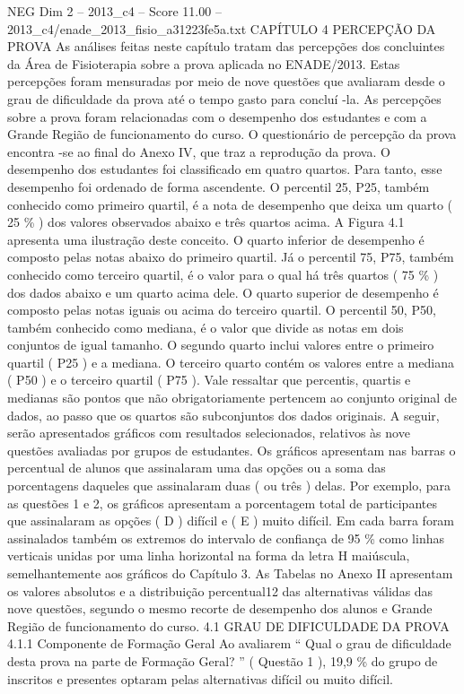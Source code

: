 \begin{textsample}{NEG Dim 2 – 2013\_c4 – Score 11.00 – 2013\_c4/enade\_2013\_fisio\_a31223fe5a.txt}  \label{ex:f2_neg_367}
CAPÍTULO 4 PERCEPÇÃO DA PROVA As análises feitas neste capítulo tratam das percepções dos concluintes da Área de Fisioterapia sobre a prova aplicada no ENADE/2013.
Estas percepções foram mensuradas por meio de nove questões que avaliaram desde o grau de dificuldade da prova até o tempo gasto para concluí -la.
As percepções sobre a prova foram relacionadas com o desempenho dos estudantes e com a Grande Região de funcionamento do curso.
O questionário de percepção da prova encontra -se ao final do Anexo IV, que traz a reprodução da prova.
O desempenho dos estudantes foi classificado em quatro quartos.
Para tanto, esse desempenho foi ordenado de forma ascendente.
O percentil 25, P25, também conhecido como primeiro quartil, é a nota de desempenho que deixa um quarto ( 25 \% ) dos valores observados abaixo e três quartos acima.
A Figura 4.1 apresenta uma ilustração deste conceito.
O quarto inferior de desempenho é composto pelas notas abaixo do primeiro quartil.
Já o percentil 75, P75, também conhecido como terceiro quartil, é o valor para o qual há três quartos ( 75 \% ) dos dados abaixo e um quarto acima dele.
O quarto superior de desempenho é composto pelas notas iguais ou acima do terceiro quartil.
O percentil 50, P50, também conhecido como mediana, é o valor que divide as notas em dois conjuntos de igual tamanho.
O segundo quarto inclui valores entre o primeiro quartil ( P25 ) e a mediana.
O terceiro quarto contém os valores entre a mediana ( P50 ) e o terceiro quartil ( P75 ).
Vale ressaltar que percentis, quartis e medianas são pontos que não obrigatoriamente pertencem ao conjunto original de dados, ao passo que os quartos são subconjuntos dos dados originais.
A seguir, serão apresentados gráficos com resultados selecionados, relativos às nove questões avaliadas por grupos de estudantes.
Os gráficos apresentam nas barras o percentual de alunos que assinalaram uma das opções ou a soma das porcentagens daqueles que assinalaram duas ( ou três ) delas.
Por exemplo, para as questões 1 e 2, os gráficos apresentam a porcentagem total de participantes que assinalaram as opções ( D ) difícil e ( E ) muito difícil.
Em cada barra foram assinalados também os extremos do intervalo de confiança de 95 \% como linhas verticais unidas por uma linha horizontal na forma da letra H maiúscula, semelhantemente aos gráficos do Capítulo 3.
As Tabelas no Anexo II apresentam os valores absolutos e a distribuição percentual12 das alternativas válidas das nove questões, segundo o mesmo recorte de desempenho dos alunos e Grande Região de funcionamento do curso. 4.1 GRAU DE DIFICULDADE DA PROVA 4.1.1 Componente de Formação Geral Ao avaliarem “ Qual o grau de dificuldade desta prova na parte de Formação Geral? ” ( Questão 1 ), 19,9 \% do grupo de inscritos e presentes optaram pelas alternativas difícil ou muito difícil.

\end{textsample}
